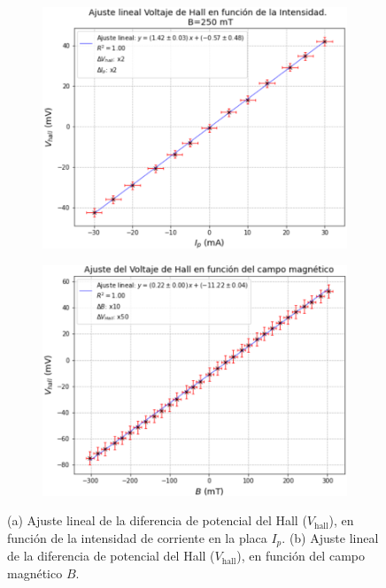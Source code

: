 			
	\begin{figure}[H]
		\centering
		\begin{subfigure}[t]{0.48\textwidth}
			\includegraphics[width=\textwidth]{grafico_1x01_Vhall_vs_Ip.png}
			\caption{}
			\label{fig:Vhall_Ip}
		\end{subfigure}
		\hfill
		\begin{subfigure}[t]{0.48\textwidth}
			\includegraphics[width=\textwidth]{grafico_1x02_Vhall_vs_B.png}
			\caption{}
			\label{fig:Vhall_B}
		\end{subfigure}
		\caption{\footnotesize{(a) Ajuste lineal de la diferencia de potencial del Hall ($V_{\text{hall}}$), en función de la intensidad de corriente en la placa $I_p$. (b) Ajuste lineal de la diferencia de potencial del Hall ($V_{\text{hall}}$), en función del campo magnético $B$.}}
		\label{fig:hall_plots}
	\end{figure}

